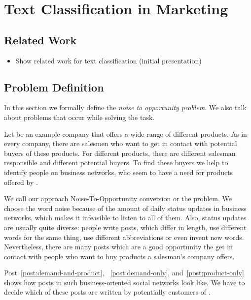 
\section{Text Classification in Marketing}
\label{sec:background}

\subsection{Related Work}

\begin{itemize}
	\item Show related work for text classification (initial presentation)
\end{itemize}

\subsection{Problem Definition}
\label{sec:background-problem}

In this section we formally define the \emph{noise to opportunity problem}.
We also talk about problems that occur while solving the task. 

Let \acme be an example company that offers a wide range of different products.
As in every company, there are salesmen who want to get in contact with potential buyers of these products. 
For different products, there are different salesman responsible and different potential buyers.
To find these buyers we help \acme to identify people on business networks, who seem to have a need for products offered by \acme.

We call our approach Noise-To-Opportunity conversion or the \nto problem.
We choose the word noise because of the amount of daily status updates in business networks, which makes it infeasible to listen to all of them.
Also, status updates are usually quite diverse: people write posts, which differ in length, use different words for the same thing, use  different abbreviations or even invent new words.
Nevertheless, there are many posts which are a good opportunity the get in contact with people who want to buy products a salesman's company offers. 

Post~\ref{post:demand-and-product}, ~\ref{post:demand-only}, and~\ref{post:product-only} shows how posts in such business-oriented social networks look like. 
We have to decide which of these posts are written by potentially customers of \acme. 

